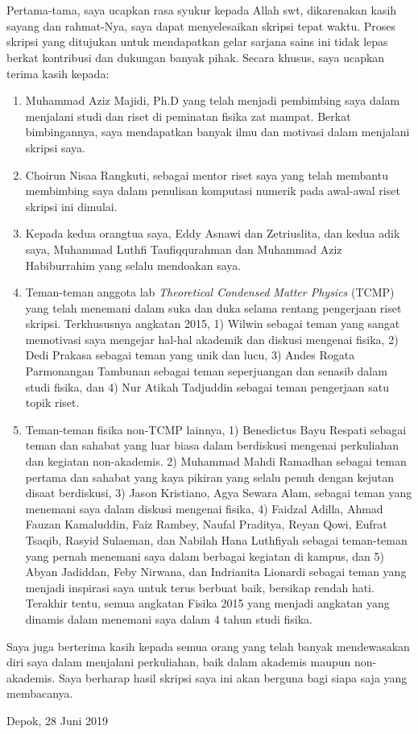 \chapter*{\kataPengantar}
Pertama-tama, saya ucapkan rasa syukur kepada Allah swt, dikarenakan kasih sayang dan
rahmat-Nya, saya dapat menyelesaikan skripsi tepat waktu. Proses skripsi yang ditujukan
untuk mendapatkan gelar sarjana sains ini tidak lepas berkat kontribusi dan dukungan 
banyak pihak. Secara khusus, saya ucapkan terima kasih kepada:

\begin{enumerate}
	\item Muhammad Aziz Majidi, Ph.D yang telah menjadi pembimbing saya dalam menjalani
	studi dan riset di peminatan fisika zat mampat. Berkat bimbingannya, saya mendapatkan
	banyak ilmu dan motivasi dalam menjalani skripsi saya.
	\item Choirun Nisaa Rangkuti, sebagai mentor riset saya yang telah membantu membimbing saya
	dalam penulisan komputasi numerik pada awal-awal riset skripsi ini dimulai. 
	\item Kepada kedua orangtua saya, Eddy Asnawi dan Zetriuslita, dan kedua adik saya, Muhammad Luthfi 
	Taufiqqurahman dan Muhammad Aziz Habiburrahim yang selalu mendoakan saya.
	\item Teman-teman anggota lab \textit{Theoretical Condensed Matter Physics} (TCMP) yang telah
	menemani dalam suka dan duka selama rentang pengerjaan riset skripsi. Terkhususnya angkatan 2015, 
	1) Wilwin sebagai teman yang sangat memotivasi saya mengejar hal-hal akademik dan diskusi mengenai fisika,
	2) Dedi Prakasa sebagai teman yang unik dan lucu, 3) Andes Rogata Parmonangan Tambunan sebagai teman seperjuangan dan senasib
	dalam studi fisika, dan 4) Nur Atikah Tadjuddin sebagai teman pengerjaan satu topik riset.
	\item Teman-teman fisika non-TCMP lainnya, 1) Benedictus Bayu Respati sebagai teman dan sahabat yang luar biasa
	dalam berdiskusi mengenai perkuliahan dan kegiatan non-akademis.	2) Muhammad Mahdi Ramadhan sebagai teman pertama dan sahabat yang kaya pikiran yang selalu penuh dengan kejutan disaat berdiskusi, 3) Jason Kristiano, Agya Sewara Alam, sebagai teman yang menemani saya dalam 	diskusi mengenai fisika, 4) Faidzal Adilla, Ahmad Fauzan Kamaluddin, Faiz Rambey, Naufal Praditya, Reyan Qowi, Eufrat Tsaqib, Rasyid Sulaeman, dan Nabilah Hana Luthfiyah sebagai teman-teman yang pernah menemani saya dalam berbagai kegiatan di kampus,	dan 5) Abyan Jadiddan, Feby Nirwana, dan Indrianita Lionardi sebagai teman yang menjadi inspirasi saya untuk terus berbuat baik, bersikap rendah hati. Terakhir tentu, semua angkatan Fisika 2015 yang menjadi angkatan yang dinamis dalam 	menemani saya dalam 4 tahun studi fisika.
\end{enumerate}
Saya juga berterima kasih kepada semua orang yang telah banyak mendewasakan diri saya dalam menjalani perkuliahan, baik
dalam akademis maupun non-akademis. Saya berharap hasil skripsi saya ini akan berguna bagi siapa saja yang membacanya.

\vspace*{0.1cm}
\begin{flushright}
Depok, 28 Juni 2019\\[0.1cm]
\vspace*{1cm}
\penulis

\end{flushright}